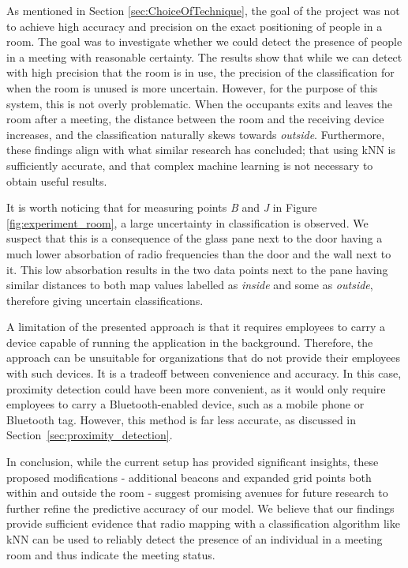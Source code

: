 As mentioned in Section \ref{sec:ChoiceOfTechnique}, the goal of the project was not to achieve high accuracy and precision on the exact positioning of people in a room. 
The goal was to investigate whether we could detect the presence of people in a meeting with reasonable certainty.
The results show that while we can detect with high precision that the room is in use, the precision of the classification for when the room is unused is more uncertain. 
However, for the purpose of this system, this is not overly problematic. 
When the occupants exits and leaves the room after a meeting, the distance between the room and the receiving device increases, and the classification naturally skews towards \textit{outside}.
Furthermore, these findings align with what similar research has concluded; that using kNN is sufficiently accurate, and that complex machine learning is not necessary to obtain useful results.\cite{ble_kneares_neural}

It is worth noticing that for measuring points \textit{B} and \textit{J} in Figure \ref{fig:experiment_room}, a large uncertainty in classification is observed.
We suspect that this is a consequence of the glass pane next to the door having a much lower absorbation of radio frequencies than the door and the wall next to it.
This low absorbation results in the two data points next to the pane having similar distances to both map values labelled as \textit{inside} and some as \textit{outside}, therefore giving uncertain classifications.

A limitation of the presented approach is that it requires employees to carry a device capable of running the application in the background.
Therefore, the approach can be unsuitable for organizations that do not provide their employees with such devices.
It is a tradeoff between convenience and accuracy.
In this case, proximity detection could have been more convenient, as it would only require employees to carry a Bluetooth-enabled device, such as a mobile phone or Bluetooth tag.
However, this method is far less accurate, as discussed in Section~\ref{sec:proximity_detection}.


In conclusion, while the current setup has provided significant insights, these proposed modifications - additional beacons and expanded grid points both within and outside the room - suggest promising avenues for future research to further refine the predictive accuracy of our model.
We believe that our findings provide sufficient evidence that radio mapping with a classification algorithm like kNN can be used to reliably detect the presence of an individual in a meeting room and thus indicate the meeting status.
